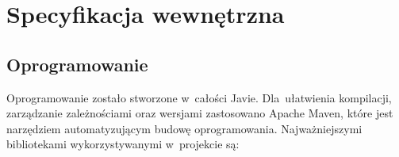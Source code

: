 \section{Specyfikacja wewnętrzna}
\subsection{Oprogramowanie}
Oprogramowanie zostało stworzone w~całości Javie. Dla~ułatwienia kompilacji, zarządzanie zależnościami oraz wersjami zastosowano Apache Maven, które jest narzędziem automatyzującym budowę oprogramowania.
Najważniejszymi bibliotekami wykorzystywanymi w~projekcie są:
